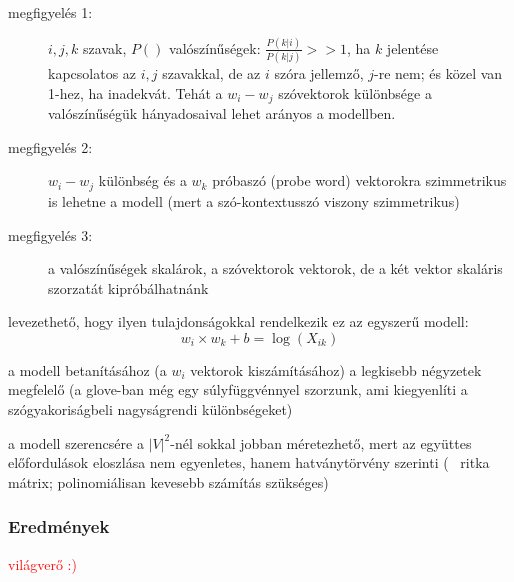 \documentclass{beamer}
\begin{document}
\begin{frame}
\begin{description}
\item[megfigyelés 1:]
\(i, j, k\) szavak, \(P()\) valószínűségek: \(\frac{P(k|i)}{P(k|j)} >> 1\), ha \(k\) jelentése kapcsolatos az \(i, j\) szavakkal, de az \(i\) szóra jellemző, \(j\)-re nem; és közel van 1-hez, ha inadekvát. Tehát a \(w_i-w_j\) szóvektorok különbsége a valószínűségük hányadosaival lehet arányos a modellben.

\item[megfigyelés 2:]
\(w_i-w_j\) különbség és a \(w_k\) próbaszó (probe word) vektorokra szimmetrikus is lehetne a modell (mert a szó-kontextusszó viszony szimmetrikus)

\item[megfigyelés 3:]
a valószínűségek skalárok, a szóvektorok vektorok, de a két vektor skaláris szorzatát kipróbálhatnánk
\end{description}
\end{frame}

\begin{frame}
levezethető, hogy ilyen tulajdonságokkal rendelkezik ez az egyszerű modell:
\[ w_i \times w_k + b = \log(X_{ik}) \]

a modell betanításához (a \(w_i\) vektorok kiszámításához) a legkisebb négyzetek megfelelő
(a glove-ban még egy súlyfüggvénnyel szorzunk, ami kiegyenlíti a szógyakoriságbeli nagyságrendi különbségeket)

a modell szerencsére a \(|V|^2\)-nél sokkal jobban méretezhető, mert az együttes előfordulások eloszlása nem egyenletes, hanem hatványtörvény szerinti (~ ritka mátrix; polinomiálisan kevesebb számítás szükséges)
\end{frame}

\begin{frame}
\frametitle{Eredmények} 
\textcolor{red}{világverő :)}
\end{frame}
\end{document}
